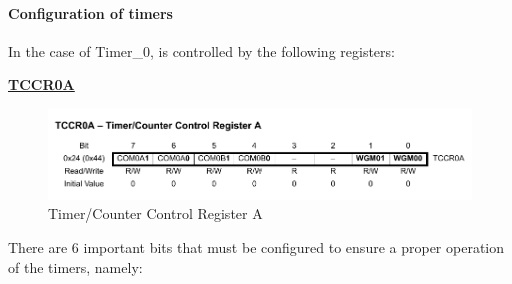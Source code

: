 \paragraph{Configuration of timers}

In the case of Timer\_0, is controlled by the following registers:

\medskip
\underline{\textbf{TCCR0A}}
\medskip


\begin{figure}[H]
    \centering
    \includegraphics[width = \textwidth]{Graphics/MICROS/Practice 4/DATASHEET/TCCR0A.pdf}
    \caption{Timer/Counter Control Register A}
    \label{fig:TCCR0A}
\end{figure}

There are 6 important bits that must be configured to ensure a proper operation of the timers, namely:

